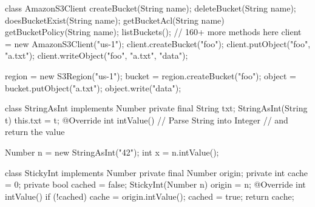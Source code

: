 \documentclass{article}
\begin{document}
\begin{lnSnippet}
class AmazonS3Client {
  createBucket(String name);
  deleteBucket(String name);
  doesBucketExist(String name);
  getBucketAcl(String name)
  getBucketPolicy(String name);
  listBuckets();
  // 160+ more methods here
}
client = new AmazonS3Client("us-1");
client.createBucket("foo");
client.putObject("foo", "a.txt");
client.writeObject("foo", "a.txt", "data");
\end{lnSnippet}
\begin{lnSnippet}
region = new S3Region("us-1");
bucket = region.createBucket("foo");
object = bucket.putObject("a.txt");
object.write("data");
\end{lnSnippet}


\begin{lnSnippet}
class StringAsInt implements Number {
  private final String txt;
  StringAsInt(String t) { this.txt = t; }
  @Override int intValue() {
    // Parse String into Integer
    // and return the value
  }
}

Number n = new StringAsInt("42");
int x = n.intValue();
\end{lnSnippet}
\begin{lnSnippet}
class StickyInt implements Number {
  private final Number origin;
  private int cache = 0;
  private bool cached = false;
  StickyInt(Number n) { origin = n; }
  @Override int intValue() {
    if (!cached) {
      cache = origin.intValue();
      cached = true;
    }
    return cache; } }
\end{lnSnippet}
\end{document}
